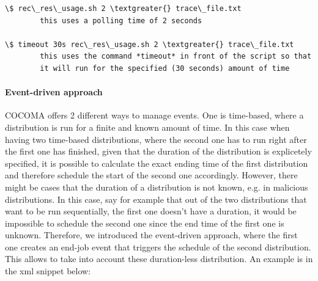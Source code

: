\documentclass[letterpaper,10pt,english]{sphinxhowto}
\begin{document}
\begin{Verbatim}[commandchars=\\\{\}]
\$ rec\_res\_usage.sh 2 \textgreater{} trace\_file.txt
        this uses a polling time of 2 seconds

\$ timeout 30s rec\_res\_usage.sh 2 \textgreater{} trace\_file.txt
        this uses the command *timeout* in front of the script so that
        it will run for the specified (30 seconds) amount of time
\end{Verbatim}


\paragraph{Event-driven approach}
\label{COCOMA/06_additional_features:event-driven-approach}
COCOMA offers 2 different ways to manage events. One is time-based, where a distribution is run for a finite and known amount of time. In this case when having two time-based distributions, where the second one has to run right after the first one has finished, given that the duration of the distribution is explicetely specified, it is possible to calculate the exact ending time of the first distribution and therefore schedule the start of the second one accordingly. However, there might be cases that the duration of a distribution is not known, e.g. in malicious distributions. In this case, say for example that out of the two distributions that want to be run sequentially, the first one doesn't have a duration, it would be impossible to schedule the second one since the end time of the first one is unknown. Therefore, we introduced the event-driven approach, where the first one creates an end-job event that triggers the schedule of the second distribution. This allows to take into account these duration-less distribution. An example is in the xml snippet below:
\end{document}

